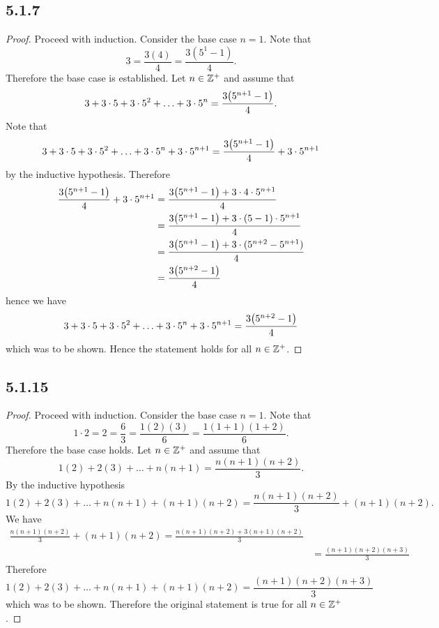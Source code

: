 \documentclass[12pt,titlepage]{extarticle}
\begin{document}
\subsection*{5.1.7}
\begin{proof}
    Proceed with induction. Consider the base case $n = 1$. Note that
    \[
        3 = \frac{3(4)}{4} = \frac{3(5^1-1)}{4}
    .\]
    Therefore the base case is established. Let $n \in \mathbb{Z}^+$ and assume that
    \[
        3 + 3\cdot 5 + 3\cdot 5^2 + \ldots + 3\cdot 5^n = \frac{3\qty(5^{n+1} - 1)}{4}
    .\]
    Note that
    \[
        3 + 3\cdot 5 + 3\cdot 5^2 + \ldots + 3\cdot 5^n + 3\cdot 5^{n+1} = \frac{3\qty(5^{n+1} - 1)}{4} + 3 \cdot 5^{n+1}

    \]
    by the inductive hypothesis. Therefore
    \begin{align*}
        \frac{3\qty(5^{n+1} - 1)}{4} + 3 \cdot 5^{n+1} &= \frac{3\qty(5^{n+1} - 1) + 3 \cdot 4 \cdot 5^{n+1}}{4} \\
                                                       &= \frac{3\qty(5^{n+1} - 1) + 3 \cdot (5-1) \cdot 5^{n+1}}{4} \\
                                                       &= \frac{3\qty(5^{n+1} - 1) + 3 \cdot (5^{n+2}-5^{n+1})}{4} \\
                                                       &= \frac{3\qty(5^{n+2} - 1)}{4} \\
    \end{align*}
    hence we have
    \[
        3 + 3\cdot 5 + 3\cdot 5^2 + \ldots + 3\cdot 5^n + 3\cdot 5^{n+1} = \frac{3\qty(5^{n+2} - 1)}{4}
    \]
    which was to be shown. Hence the statement holds for all $n \in \mathbb{Z}^+$.
\end{proof}

\subsection*{5.1.15}
\begin{proof}
    Proceed with induction. Consider the base case $n = 1$. Note that
    \[
        1 \cdot 2 = 2 = \frac{6}{3} = \frac{1(2)(3)}{6} = \frac{1(1+1)(1+2)}{6}
    .\]
    Therefore the base case holds. Let $n \in \mathbb{Z}^+$ and assume that
    \[
        1(2) + 2(3) + \ldots + n(n+1) = \frac{n(n+1)(n+2)}{3}
    .\]
    By the inductive hypothesis
    \[
        1(2) + 2(3) + \ldots + n(n+1) + (n+1)(n+2) = \frac{n(n+1)(n+2)}{3} + (n+1)(n+2)
    .\]
    We have
    \begin{align*}
        \frac{n(n+1)(n+2)}{3} + (n+1)(n+2) = \frac{n(n+1)(n+2) + 3(n+1)(n+2)}{3} \\
        &= \frac{(n+1)(n+2)(n+3)}{3}
    \end{align*}
    Therefore
    \[
        1(2) + 2(3) + \ldots + n(n+1) + (n+1)(n+2) = \frac{(n+1)(n+2)(n+3)}{3}
    \]
    which was to be shown. Therefore the original statement is true for all $n \in \mathbb{Z}^+$.
\end{proof}
\end{document}
